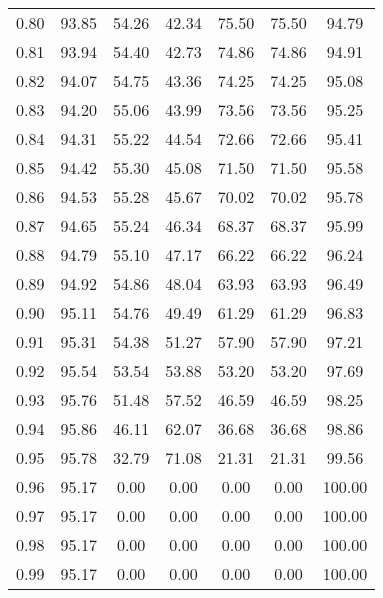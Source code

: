 \begin{tabular}{|c|c|c|c|c|c|c|}
      0.80 &     93.85 &     54.26 &      42.34 &   75.50 &      75.50 &         94.79 \\
      0.81 &     93.94 &     54.40 &      42.73 &   74.86 &      74.86 &         94.91 \\
      0.82 &     94.07 &     54.75 &      43.36 &   74.25 &      74.25 &         95.08 \\
      0.83 &     94.20 &     55.06 &      43.99 &   73.56 &      73.56 &         95.25 \\
      0.84 &     94.31 &     55.22 &      44.54 &   72.66 &      72.66 &         95.41 \\
      0.85 &     94.42 &     55.30 &      45.08 &   71.50 &      71.50 &         95.58 \\
      0.86 &     94.53 &     55.28 &      45.67 &   70.02 &      70.02 &         95.78 \\
      0.87 &     94.65 &     55.24 &      46.34 &   68.37 &      68.37 &         95.99 \\
      0.88 &     94.79 &     55.10 &      47.17 &   66.22 &      66.22 &         96.24 \\
      0.89 &     94.92 &     54.86 &      48.04 &   63.93 &      63.93 &         96.49 \\
      0.90 &     95.11 &     54.76 &      49.49 &   61.29 &      61.29 &         96.83 \\
      0.91 &     95.31 &     54.38 &      51.27 &   57.90 &      57.90 &         97.21 \\
      0.92 &     95.54 &     53.54 &      53.88 &   53.20 &      53.20 &         97.69 \\
      0.93 &     95.76 &     51.48 &      57.52 &   46.59 &      46.59 &         98.25 \\
      0.94 &     95.86 &     46.11 &      62.07 &   36.68 &      36.68 &         98.86 \\
      0.95 &     95.78 &     32.79 &      71.08 &   21.31 &      21.31 &         99.56 \\
      0.96 &     95.17 &      0.00 &       0.00 &    0.00 &       0.00 &        100.00 \\
      0.97 &     95.17 &      0.00 &       0.00 &    0.00 &       0.00 &        100.00 \\
      0.98 &     95.17 &      0.00 &       0.00 &    0.00 &       0.00 &        100.00 \\
      0.99 &     95.17 &      0.00 &       0.00 &    0.00 &       0.00 &        100.00 \\
\bottomrule
\end{tabular}

